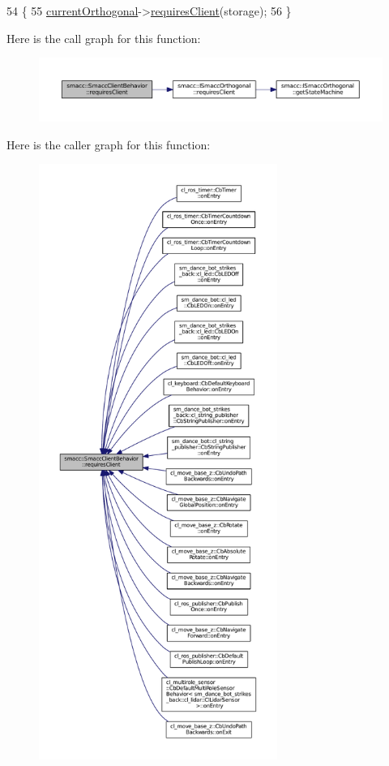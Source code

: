 \begin{DoxyCode}
54 \{
55     \hyperlink{classsmacc_1_1SmaccClientBehavior_a37e6a2fe61c3a72ed2f3e4180f552089}{currentOrthogonal}->\hyperlink{classsmacc_1_1ISmaccOrthogonal_a602e16b09f8a1b3de889f2f3d90a3211}{requiresClient}(storage);
56 \}
\end{DoxyCode}


Here is the call graph for this function\+:
\nopagebreak
\begin{figure}[H]
\begin{center}
\leavevmode
\includegraphics[width=350pt]{classsmacc_1_1SmaccClientBehavior_a917f001e763a1059af337bf4e164f542_cgraph}
\end{center}
\end{figure}




Here is the caller graph for this function\+:
\nopagebreak
\begin{figure}[H]
\begin{center}
\leavevmode
\includegraphics[height=550pt]{classsmacc_1_1SmaccClientBehavior_a917f001e763a1059af337bf4e164f542_icgraph}
\end{center}
\end{figure}


